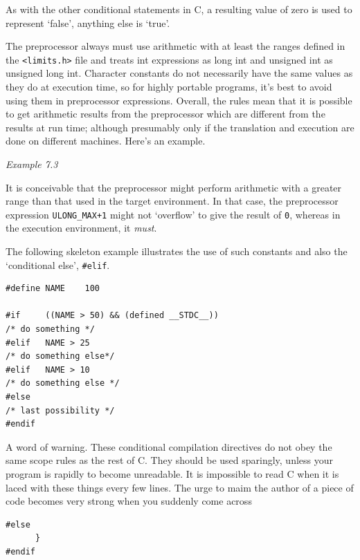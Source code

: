    As with the other conditional statements in C, a resulting value of
    zero is used to represent `false', anything else is
    `true'.


   The preprocessor always must use arithmetic with at least the ranges
    defined in the \texttt{<limits.h>} file and treats int
    expressions as long int and unsigned int as unsigned long int. Character
    constants do not necessarily have the same values as they do at
    execution time, so for highly portable programs, it's best to avoid
    using them in preprocessor expressions. Overall, the rules mean that it
    is possible to get arithmetic results from the preprocessor which are
    different from the results at run time; although presumably only if the
    translation and execution are done on different machines. Here's an
    example.


   \begin{center}\textit{Example 7.3}\end{center}


   It is conceivable that the preprocessor might perform arithmetic with
    a greater range than that used in the target environment. In that case,
    the preprocessor expression \texttt{ULONG\_MAX+1} might not
    `overflow' to give the result of \texttt{0}, whereas in the
    execution environment, it \textit{must}.


   The following skeleton example illustrates the use of such constants
    and also the `conditional else', \texttt{\#elif}.


   \begin{Verbatim}
#define NAME    100

#if     ((NAME > 50) && (defined __STDC__))
/* do something */
#elif   NAME > 25
/* do something else*/
#elif   NAME > 10
/* do something else */
#else
/* last possibility */
#endif
\end{Verbatim}

   A word of warning. These conditional compilation directives do not
    obey the same scope rules as the rest of C. They should be used
    sparingly, unless your program is rapidly to become unreadable. It is
    impossible to read C when it is laced with these things every few lines.
    The urge to maim the author of a piece of code becomes very strong when
    you suddenly come across


   \begin{Verbatim}
#else
      }
#endif
\end{Verbatim}

